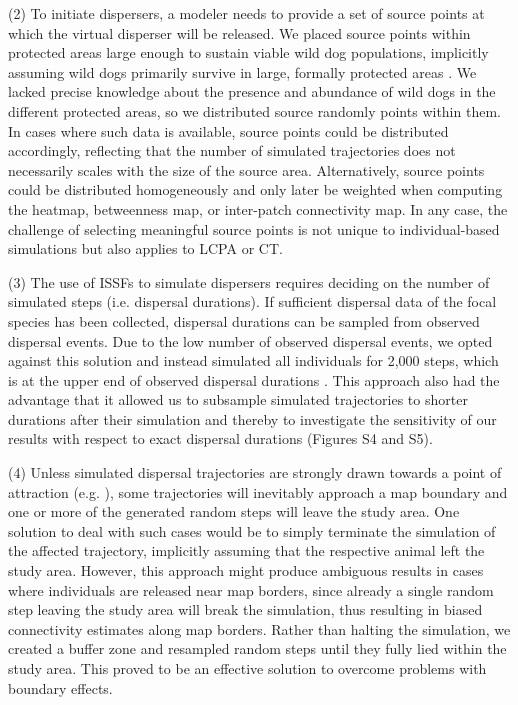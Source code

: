 \documentclass[abstract=on,10pt,a4paper,bibliography=totocnumbered]{article}
\begin{document}
(2) To initiate dispersers, a modeler needs to provide a set of source points at
which the virtual disperser will be released. We placed source points within
protected areas large enough to sustain viable wild dog populations, implicitly
assuming wild dogs primarily survive in large, formally protected areas
\citep{Woodroffe.1999, DaviesMostert.2012, Woodroffe.2012, VanDerMeer.2014}. We
lacked precise knowledge about the presence and abundance of wild dogs in the
different protected areas, so we distributed source randomly points within them.
In cases where such data is available, source points could be distributed
accordingly, reflecting that the number of simulated trajectories does not
necessarily scales with the size of the source area. Alternatively, source
points could be distributed homogeneously and only later be weighted when
computing the heatmap, betweenness map, or inter-patch connectivity map. In any
case, the challenge of selecting meaningful source points is not unique to
individual-based simulations but also applies to LCPA or CT.

(3) The use of ISSFs to simulate dispersers requires deciding on the number of
simulated steps (i.e. dispersal durations). If sufficient dispersal data of the
focal species has been collected, dispersal durations can be sampled from
observed dispersal events. Due to the low number of observed dispersal events,
we opted against this solution and instead simulated all individuals for 2,000
steps, which is at the upper end of observed dispersal durations
\citep{DaviesMostert.2012, Masenga.2016, Cozzi.2020, Hofmann.2021}. This
approach also had the advantage that it allowed us to subsample simulated
trajectories to shorter durations after their simulation and thereby to
investigate the sensitivity of our results with respect to exact dispersal
durations (Figures S4 and S5).

(4) Unless simulated dispersal trajectories are strongly drawn towards a point
of attraction (e.g. \citealp{Signer.2017}), some trajectories will inevitably
approach a map boundary and one or more of the generated random steps will leave
the study area. One solution to deal with such cases would be to simply
terminate the simulation of the affected trajectory, implicitly assuming that
the respective animal left the study area. However, this approach might produce
ambiguous results in cases where individuals are released near map borders,
since already a single random step leaving the study area will break the
simulation, thus resulting in biased connectivity estimates along map borders.
Rather than halting the simulation, we created a buffer zone \citep{Koen.2010}
and resampled random steps until they fully lied within the study area. This
proved to be an effective solution to overcome problems with boundary effects.
\end{document}
